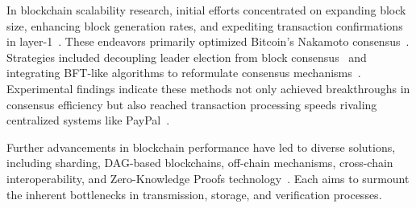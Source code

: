 \documentclass[conference]{IEEEtran}
\begin{document}

In blockchain scalability research, initial efforts concentrated on expanding block size, enhancing block generation rates, and expediting transaction confirmations in layer-1~\cite{Eyal2016BitcoinNG,Kokoriskogias2016Byzcoin,Algorand,GHOST,HotStuff,bagaria2019prism}. These endeavors primarily optimized Bitcoin's Nakamoto consensus~\cite{Nakamoto2008Bitcoin}. Strategies included decoupling leader election from block consensus~\cite{Eyal2016BitcoinNG} and integrating BFT-like algorithms to reformulate consensus mechanisms~\cite{Kokoriskogias2016Byzcoin,Algorand,HotStuff}. Experimental findings indicate these methods not only achieved breakthroughs in consensus efficiency but also reached transaction processing speeds rivaling centralized systems like PayPal~\cite{Kokoriskogias2016Byzcoin}.

Further advancements in blockchain performance have led to diverse solutions, including sharding, DAG-based blockchains, off-chain mechanisms, cross-chain interoperability, and Zero-Knowledge Proofs technology~\cite{OmniLedger,OHIE,RapidChain,Sharding2016,Chainspace,IOTA,conflux,PHANTOM,LN,Plasma,OptimisticRollup,dilley2016strong,wood2016polkadot,thomas2015protocol,garoffolo2020zendoo,sasson2014zerocash,ben2014succinct,bowe2019recursive,gluchowski2019zk}. Each aims to surmount the inherent bottlenecks in transmission, storage, and verification processes.
\end{document}
